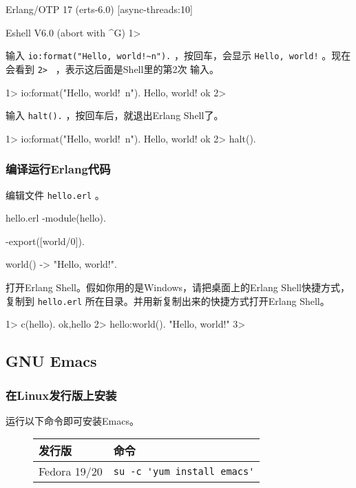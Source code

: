 \documentclass[preview,multi,crop=false,border=1in,class=memoir]{standalone}
\begin{document}
\begin{preview-page}
\begin{Listing}
Erlang/OTP 17 (erts-6.0) [async-threads:10]

Eshell V6.0  (abort with ^G)
1>
\end{Listing}

输入 \verb|io:format("Hello, world!~n").| ，按回车，会显示
\verb|Hello, world!| 。现在会看到 \verb|2> | ，表示这后面是Shell里的第2次
输入。

\begin{ErlangShellSession}
1> io:format("Hello, world!~n").
Hello, world!
ok
2>
\end{ErlangShellSession}

输入 \verb|halt().| ，按回车后，就退出Erlang Shell了。

\begin{Listing}
1> io:format("Hello, world!~n").
Hello, world!
ok
2> halt().
\end{Listing}

\subsubsection{编译运行Erlang代码}

编辑文件 \verb|hello.erl| 。

\begin{SourceCode}{hello.erl}
-module(hello).

-export([world/0]).

world() -> "Hello, world!".
\end{SourceCode}

打开Erlang Shell。假如你用的是Windows，请把桌面上的Erlang Shell快捷方式，
复制到 \verb|hello.erl| 所在目录。并用新复制出来的快捷方式打开Erlang
Shell。

\begin{ErlangShellSession}
1> c(hello).
{ok,hello}
2> hello:world().
"Hello, world!"
3>
\end{ErlangShellSession}

\subsection{GNU Emacs}

\subsubsection{在Linux发行版上安装}

运行以下命令即可安装Emacs。

\begin{figure}[hbt]
\centering
\begin{tabular}{|l|l|}
\hline
发行版 & 命令 \\
\hline
Fedora 19/20 & \verb|su -c 'yum install emacs'| \\
\hline
\end{tabular}
\end{figure}


\end{preview-page}
\end{document}
